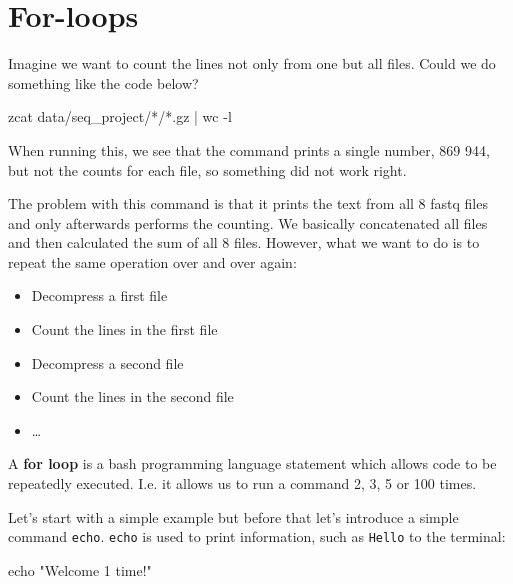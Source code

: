 \documentclass[
  letterpaper,
  DIV=11,
  numbers=noendperiod]{scrreprt}
\newenvironment{Shaded}{}{}
\newcommand{\AttributeTok}[1]{\textcolor[rgb]{0.84,0.23,0.29}{#1}}
\newcommand{\BuiltInTok}[1]{\textcolor[rgb]{0.84,0.23,0.29}{#1}}
\newcommand{\FunctionTok}[1]{\textcolor[rgb]{0.44,0.26,0.76}{#1}}
\newcommand{\KeywordTok}[1]{\textcolor[rgb]{0.84,0.23,0.29}{#1}}
\newcommand{\NormalTok}[1]{\textcolor[rgb]{0.14,0.16,0.18}{#1}}
\newcommand{\PreprocessorTok}[1]{\textcolor[rgb]{0.84,0.23,0.29}{#1}}
\newcommand{\StringTok}[1]{\textcolor[rgb]{0.01,0.18,0.38}{#1}}
\providecommand{\tightlist}{%
  \setlength{\itemsep}{0pt}\setlength{\parskip}{0pt}}\usepackage{longtable,booktabs,array}
\begin{document}
\section{For-loops}\label{for-loops}

Imagine we want to count the lines not only from one but all files.
Could we do something like the code below?

\begin{Shaded}
\begin{Highlighting}[]
\FunctionTok{zcat}\NormalTok{ data/seq\_project/}\PreprocessorTok{*}\NormalTok{/}\PreprocessorTok{*}\NormalTok{.gz }\KeywordTok{|} \FunctionTok{wc} \AttributeTok{{-}l}
\end{Highlighting}
\end{Shaded}

When running this, we see that the command prints a single number, 869
944, but not the counts for each file, so something did not work right.

The problem with this command is that it prints the text from all 8
fastq files and only afterwards performs the counting. We basically
concatenated all files and then calculated the sum of all 8 files.
However, what we want to do is to repeat the same operation over and
over again:

\begin{itemize}
\tightlist
\item
  Decompress a first file
\item
  Count the lines in the first file
\item
  Decompress a second file
\item
  Count the lines in the second file
\item
  \ldots{}
\end{itemize}

A \textbf{for loop} is a bash programming language statement which
allows code to be repeatedly executed. I.e. it allows us to run a
command 2, 3, 5 or 100 times.

Let's start with a simple example but before that let's introduce a
simple command \texttt{echo}. \texttt{echo} is used to print
information, such as \texttt{Hello} to the terminal:

\begin{Shaded}
\begin{Highlighting}[]
\BuiltInTok{echo} \StringTok{"Welcome 1 time!"}
\end{Highlighting}
\end{Shaded}
\end{document}
